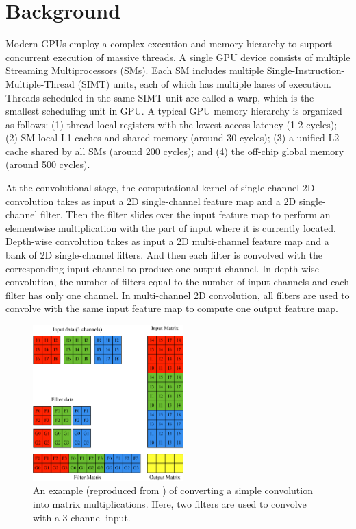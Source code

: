 
\section{Background}
{\color{red}Modern GPUs employ a complex execution and memory hierarchy to support concurrent execution of massive threads. A single GPU device consists of multiple Streaming Multiprocessors (SMs). Each SM includes multiple Single-Instruction-Multiple-Thread (SIMT) units, each of which has multiple lanes of execution. Threads scheduled in the same SIMT unit are called a warp, which is the smallest scheduling unit in GPU. A typical GPU memory hierarchy is organized as follows: (1) thread local registers with the lowest access latency (1-2 cycles); (2) SM local L1 caches and shared memory (around 30 cycles); (3) a unified L2 cache shared by all SMs (around 200 cycles); and (4) the off-chip global memory (around 500 cycles).}

At the convolutional stage, the computational kernel {\color{red}of single-channel 2D convolution takes as input a 2D single-channel feature map and a 2D single-channel filter. Then the filter slides over the input feature map to perform an elementwise multiplication with the part of input where it is currently located. Depth-wise convolution takes as input a 2D multi-channel feature map and a bank of 2D single-channel filters. And then each filter is convolved with the corresponding input channel to produce one output channel. In depth-wise convolution, the number of filters equal to the number of input channels and each filter has only one channel. In multi-channel 2D convolution, all filters are used to convolve with the same input feature map to compute one output feature map.}


\begin{figure}
\centering
  \includegraphics[width=0.75\columnwidth,height=6cm]{./figure/convlowering.eps}
  \caption{An example (reproduced from \cite{ChetlurWVCTCS14}) of converting a simple convolution into matrix multiplications. Here, two filters are used to convolve with a 3-channel input.}
  \label{fig:convlowering}
\end{figure}

